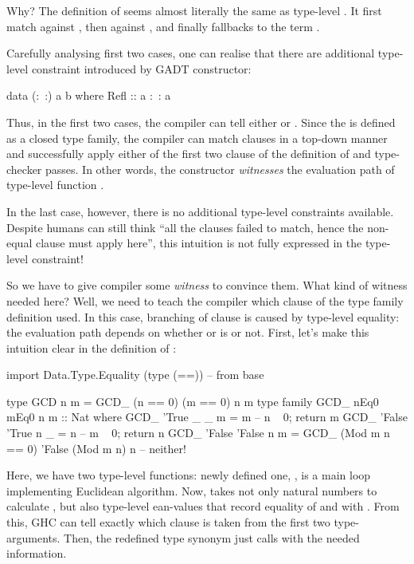 \documentclass[demotion-paper.tex]{subfiles}
\begin{document}
Why? The definition of  seems almost literally the same as type-level .
It first match  against , then  against , and finally fallbacks to the term .

Carefully analysing first two cases, one can realise that there are additional type-level constraint introduced by  GADT constructor:

\begin{code}
data (:~:) a b where
  Refl :: a :~: a
\end{code}

Thus, in the first two cases, the compiler can tell either  or .
Since the  is defined as a closed type family, the compiler can match clauses in a top-down manner and successfully apply either of the first two clause of the definition of  and type-checker passes.
In other words, the constructor  \emph{witnesses} the evaluation path of type-level function .

In the last case, however, there is no additional type-level constraints available.
Despite humans can still think ``all the  clauses failed to match, hence the non-equal clause must apply here'', this intuition is not fully expressed in the type-level constraint!

So we have to give compiler some \emph{witness} to convince them.
What kind of witness needed here?
Well, we need to teach the compiler which clause of the type family definition used.
In this case, branching of clause is caused by type-level equality: the evaluation path depends on whether  or  is  or not.
First, let's make this intuition clear in the definition of :

\begin{code}
import Data.Type.Equality (type (==)) -- from base

type GCD n m = GCD_ (n == 0) (m == 0) n m
type family GCD_ nEq0 mEq0 n m :: Nat where
  GCD_ 'True  _      _ m = m   -- n ~ 0; return m
  GCD_ 'False 'True  n _ = n   -- m ~ 0; return n
  GCD_ 'False 'False n m = GCD_ (Mod m n == 0) 'False (Mod m n) n  -- neither!
\end{code}

Here, we have two type-level functions: newly defined one, , is a main loop implementing Euclidean algorithm.
Now,  takes not only natural numbers to calculate , but also type-level ean-values that record equality of  and  with .
From this, GHC can tell exactly which clause is taken from the first two type-arguments.
Then, the redefined type synonym  just calls  with the needed information.
\end{document}
